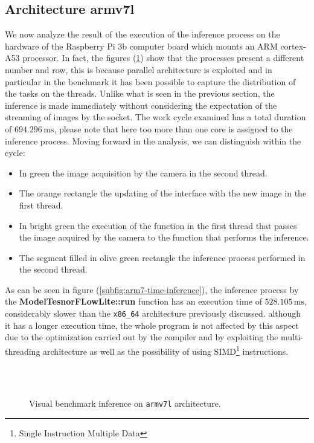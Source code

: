 \subsection{Architecture armv7l}
\label{ssec:armv7l-bench-inference}
%
We now analyze the result of the execution of the inference process on the
hardware of the Raspberry Pi 3b computer board which mounts an ARM cortex-A53
processor.
In fact, the figures (\ref{fig:armv7l-bench}) show that the processes present a
different number and row, this is because parallel architecture is exploited and
in particular in the benchmark it has been possible to capture the distribution
of the tasks on the threads.
Unlike what is seen in the previous section, the inference is made immediately without
considering the expectation of the streaming of images by the socket.
The work cycle examined has a total duration of $694.296 \,\si{\milli\second}$,
please note that here too more than one core is assigned to the inference
process.
Moving forward in the analysis, we can distinguish within the cycle:
\begin{itemize}
	\item In green the image acquisition by the camera in the second thread.
	\item The orange rectangle the updating of the interface with the new image in the first thread.
	\item In bright green the execution of the function in the first thread that passes the image acquired by the camera to the function that performs the inference.
	\item The segment filled in olive green rectangle the inference process performed in the second thread.
\end{itemize}
As can be seen in figure (\ref{subfig:arm7-time-inference}), the inference process by the
\textbf{ModelTesnorFLowLite::run} function has an execution time of $528.105 
\,\si{\milli\second}$, considerably slower than the \texttt{x86\_64}
architecture previously discussed. although it has a longer execution time, the
whole program is not affected by this aspect due to the optimization carried out
by the compiler and by exploiting the multi-threading architecture as well as the
possibility of using SIMD\footnote{Single Instruction Multiple Data}
instructions.
%
\begin{figure}[ht]
	\centering
	 \\
	 \\
	\caption{Visual benchmark inference on \texttt{armv7l} architecture.}
	\label{fig:armv7l-bench}
\end{figure}
%
%
